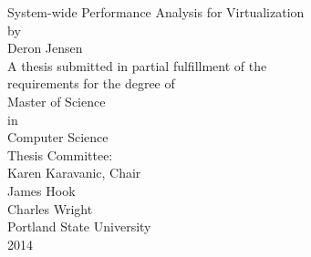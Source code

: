 \begin{titlepage}
\begin{centering}
System-wide Performance Analysis for Virtualization \\
\vspace{6\baselineskip}\vspace{-\parskip}
by \\
\vspace{1\baselineskip}\vspace{-\parskip}
Deron Jensen \\
\vspace{6\baselineskip}\vspace{-\parskip}
A thesis submitted in partial fulfillment of the \\
requirements for the degree of \\
\vspace{3\baselineskip}\vspace{-\parskip}
Master of Science \\
in \\
Computer Science \\
\vspace{3\baselineskip}\vspace{-\parskip}
Thesis Committee: \\
Karen Karavanic, Chair \\
James Hook \\
Charles Wright \\
\vspace{3\baselineskip}\vspace{-\parskip}
Portland State University \\
2014\\
\end{centering}
\end{titlepage}
